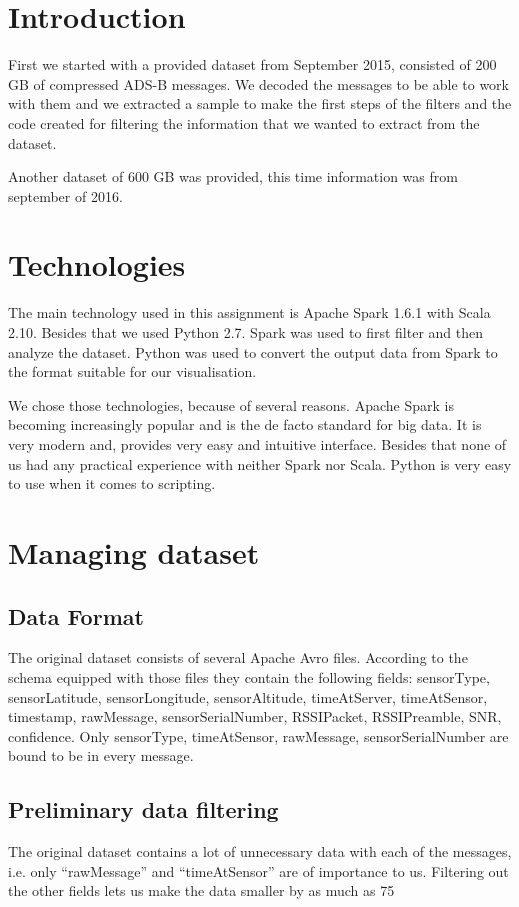 \documentclass{vldb}
\begin{document}
\section{Introduction}
First we started with a provided dataset from September 2015, 
consisted of 200 GB of compressed ADS-B messages. 
We decoded the messages to be able to work with them 
and we extracted a sample to make the first steps of the filters 
and the code created for filtering the information that we wanted to extract from the dataset.

Another dataset of 600 GB was provided, this time information was from september of 2016.

\section{Technologies}
The main technology used in this assignment is Apache Spark 1.6.1 with Scala 2.10. 
Besides that we used Python 2.7. Spark was used to first filter and then analyze the dataset. 
Python was used to convert the output data from Spark to the format suitable for our visualisation.

We chose those technologies, because of several reasons. 
Apache Spark is becoming increasingly popular and is the de facto standard for big data. 
It is very modern and, provides very easy and intuitive interface. 
Besides that none of us had any practical experience with neither Spark nor Scala. 
Python is very easy to use when it comes to scripting.

\section{Managing dataset}
\subsection{Data Format}
The original dataset consists of several Apache Avro files. 
According to the schema equipped with those files they contain the following fields: sensorType, sensorLatitude, 
sensorLongitude, sensorAltitude, timeAtServer, timeAtSensor, timestamp, rawMessage, sensorSerialNumber, RSSIPacket, 
RSSIPreamble, SNR, confidence. Only sensorType, timeAtSensor, rawMessage, sensorSerialNumber are bound to be in every message.

\subsection{Preliminary data filtering}
The original dataset contains a lot of unnecessary data with each of the messages,
 i.e. only “rawMessage” and “timeAtSensor” are of importance to us. 
Filtering out the other fields lets us make the data smaller by as much as 75%
\end{document}
